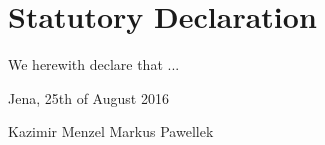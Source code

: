 \newpage
\thispagestyle{empty}
\section*{Statutory Declaration}
\bigskip


We herewith declare that ...

\vspace{1 cm}

\noindent
Jena, 25th of August 2016

\vspace{1 cm}
\hspace{6 cm} Kazimir Menzel \hspace{3 cm} Markus Pawellek
